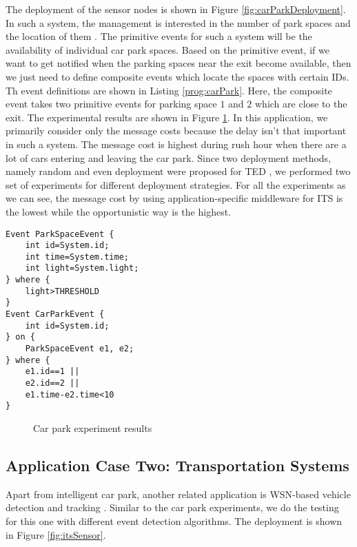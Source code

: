 The deployment of the sensor nodes is shown in Figure \ref{fig:carParkDeployment}. In such a system, the management is interested in the number of park spaces and the location of them \cite{tang:carpark}. The primitive events for such a system will be the availability of individual car park spaces. Based on the primitive event, if we want to get notified when the parking spaces near the exit become available, then we just need to define composite events which locate the spaces with certain IDs. Th event definitions are shown in Listing \ref{prog:carPark}. Here, the composite event takes two primitive events for parking space \(1\) and \(2\) which are close to the exit. The experimental results are shown in Figure \ref{fig:carParkResults}. In this application, we primarily consider only the message costs because the delay isn't that important in such a system. The message cost is highest during rush hour when there are a lot of cars entering and leaving the car park. Since two deployment methods, namely random and even deployment were proposed for TED \cite{lai:ted}, we performed two set of experiments for different deployment strategies. For all the experiments as we can see, the message cost by using application-specific middleware for ITS is the lowest while the opportunistic way is the highest.

\begin{lstlisting}[caption=Event definition for a car park, label=prog:carPark]
Event ParkSpaceEvent {
	int id=System.id;
	int time=System.time;
	int light=System.light;
} where {
	light>THRESHOLD
}
Event CarParkEvent {
	int id=System.id;
} on {
	ParkSpaceEvent e1, e2;
} where {
	e1.id==1 ||
	e2.id==2 ||
	e1.time-e2.time<10
}
\end{lstlisting}

\begin{figure}
\centering
{}
\qquad
{}
\caption{Car park experiment results}
\label{fig:carParkResults}
\end{figure}

\subsection{Application Case Two: Transportation Systems}
Apart from intelligent car park, another related application is WSN-based vehicle detection and tracking \cite{lai:its}. Similar to the car park experiments, we do the testing for this one with different event detection algorithms. The deployment is shown in Figure \ref{fig:itsSensor}.

